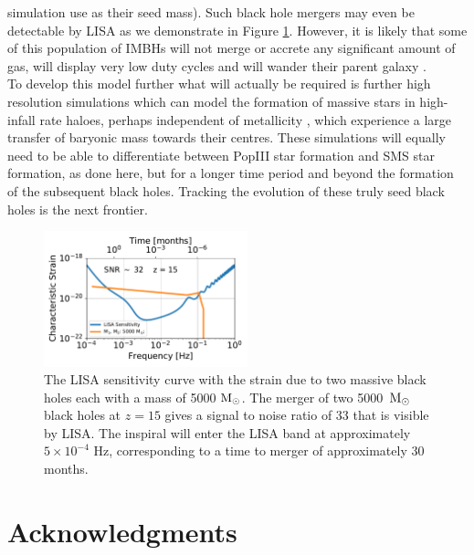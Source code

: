 \documentclass[graphics, twocolumn, usenatbib]{mn2e}
\newcommand{\msolar} {$\rm{M_{\odot}}~$}
\newcommand{\msolarc} {$\rm{M_{\odot}}$}
\begin{document}
simulation use as their seed mass). Such black hole mergers may even be
detectable by LISA as we demonstrate in Figure \ref{Fig:Sensitivity}. However, it is likely that some of this population of IMBHs will not merge or accrete any significant amount of gas, will display very low duty cycles and will wander their parent galaxy \citep{Tremmel_2018, Reines_2020, Barausse_2020}.\\
\indent To develop this model further what will actually be required is further high
resolution simulations which can model the formation of massive stars in high-infall rate haloes,
perhaps independent of metallicity \citep{Chon_2020, Regan_2020a}, which experience
a large transfer of baryonic mass towards their centres. These simulations will equally need to
be able to differentiate between PopIII star formation and SMS star formation, as done here, but
for a longer time period and beyond the formation of the subsequent black holes.
Tracking the evolution of these truly seed black holes is the next frontier. 

\begin{figure}
   \centering 
\includegraphics[width=0.525\textwidth]{FIGURES/Sensitivity.pdf}
\caption{The LISA sensitivity curve with the strain due to two massive black holes each with a mass
  of 5000 \msolarc. The merger of two 5000~\msolar black holes at $z = 15$ gives a
  signal to noise ratio of 33 that is visible by LISA. The inspiral will enter the LISA band at
  approximately $5 \times 10^{-4}$ Hz, corresponding to a time to merger of approximately 30 months.}
\label{Fig:Sensitivity}
\end{figure}
\section*{Acknowledgments}
\end{document}
